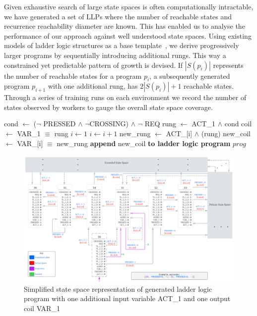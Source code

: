 \documentclass[conference,compsoc]{IEEEtran}
\begin{document}
Given exhaustive search of large state spaces is often computationally intractable, we have generated a set of LLPs where the number of reachable states and recurrence reachability diameter are known. This has enabled us to analyse the performance of our approach against well understood state spaces. Using existing models of ladder logic structures as a base template~\cite{james2013verification}, we derive progressively larger programs by sequentially introducing additional rungs. This way a constrained yet predictable pattern of growth is devised. If $|S(p_i)|$ represents the number of reachable states for a program $p_i$, a subsequently generated program $p_{i+1}$ with one additional rung, has $2|S(p_i)|+1$ reachable states. Through a series of training runs on each environment we record the number of states observed by workers to gauge the overall state space coverage. 
\begin{algorithmic}
	\State cond $\gets$ ($\lnot$ PRESSED $\land$ $\lnot$CROSSING) $\land$ $\lnot$ REQ
	\State rung $\gets$ ACT\_1 $\land$ cond
	\State coil $\gets$ VAR\_1 $\equiv$ rung
	\State $i \gets 1$ 
	\State $i \gets i+1$
	\State new\_rung $\gets$ ACT\_[i] $\land$ (rung)
	\State new\_coil $\gets$ VAR\_[i] $\equiv$ new\_rung
	\State \textbf{append} new\_coil \textbf{to ladder logic program} $prog$
	\EndWhile
	\EndProcedure
\end{algorithmic}

\begin{figure}[!t]
\centering
\includegraphics[width=\textwidth]{figs/pelican_states.png}
\caption{Simplified state space representation of generated ladder logic program with one additional input variable ACT\_1 and one output coil VAR\_1}
\label{fig:state_space}
\end{figure}
\end{document}
